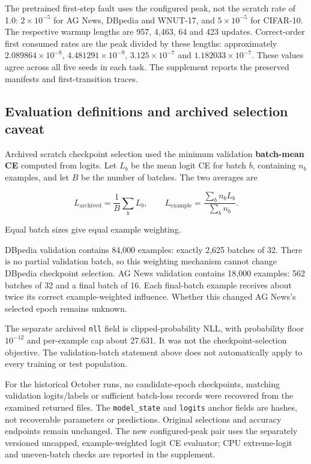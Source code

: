 \documentclass[referee,pdflatex,sn-mathphys-num]{sn-jnl}
\begin{document}
The pretrained first-step fault uses the configured peak, not the scratch rate of 1.0: \(2\times10^{-5}\) for AG News, DBpedia and WNUT-17, and \(5\times10^{-5}\) for CIFAR-10. The respective warmup lengths are 957, 4,463, 64 and 423 updates. Correct-order first consumed rates are the peak divided by these lengths: approximately \(2.089864\times10^{-8}\), \(4.481291\times10^{-9}\), \(3.125\times10^{-7}\) and \(1.182033\times10^{-7}\). These values agree across all five seeds in each task. The supplement reports the preserved manifests and first-transition traces.

\subsection{Evaluation definitions and archived selection caveat}\label{evaluation-definitions-and-archived-selection-caveat}

Archived scratch checkpoint selection used the minimum validation \textbf{batch-mean CE} computed from logits. Let \(L_b\) be the mean logit CE for batch \(b\), containing \(n_b\) examples, and let \(B\) be the number of batches. The two averages are

\[
L_{\mathrm{archived}}=\frac{1}{B}\sum_b L_b,\qquad L_{\mathrm{example}}=\frac{\sum_b n_b L_b}{\sum_b n_b}.
\]

Equal batch sizes give equal example weighting.

DBpedia validation contains 84,000 examples: exactly 2,625 batches of 32. There is no partial validation batch, so this weighting mechanism cannot change DBpedia checkpoint selection. AG News validation contains 18,000 examples: 562 batches of 32 and a final batch of 16. Each final-batch example receives about twice its correct example-weighted influence. Whether this changed AG News's selected epoch remains unknown.

The separate archived \texttt{nll} field is clipped-probability NLL, with probability floor \(10^{-12}\) and per-example cap about 27.631. It was not the checkpoint-selection objective. The validation-batch statement above does not automatically apply to every training or test population.

For the historical October runs, no candidate-epoch checkpoints, matching validation logits/labels or sufficient batch-loss records were recovered from the examined returned files. The \texttt{model\_state} and \texttt{logits} anchor fields are hashes, not recoverable parameters or predictions. Original selections and accuracy endpoints remain unchanged. The new configured-peak pair uses the separately versioned uncapped, example-weighted logit CE evaluator; CPU extreme-logit and uneven-batch checks are reported in the supplement.
\end{document}
